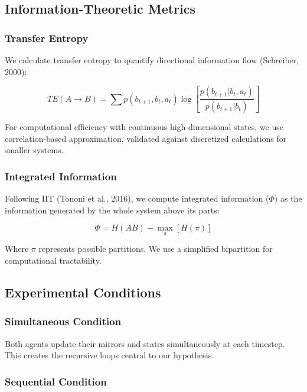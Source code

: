 \documentclass[12pt]{article}
\begin{document}
\subsection{Information-Theoretic Metrics}

\subsubsection{Transfer Entropy}

We calculate transfer entropy to quantify directional information flow (Schreiber, 2000):

\begin{equation}
TE(A \rightarrow B) = \sum p(b_{t+1}, b_t, a_t) \log\left[\frac{p(b_{t+1}|b_t, a_t)}{p(b_{t+1}|b_t)}\right]
\end{equation}

For computational efficiency with continuous high-dimensional states, we use correlation-based approximation, validated against discretized calculations for smaller systems.

\subsubsection{Integrated Information}

Following IIT (Tononi et al., 2016), we compute integrated information ($\Phi$) as the information generated by the whole system above its parts:

\begin{equation}
\Phi = H(AB) - \max_{\pi}[H(\pi)]
\end{equation}

Where $\pi$ represents possible partitions. We use a simplified bipartition for computational tractability.

\subsection{Experimental Conditions}

\subsubsection{Simultaneous Condition}

Both agents update their mirrors and states simultaneously at each timestep. This creates the recursive loops central to our hypothesis.

\subsubsection{Sequential Condition}
\end{document}
